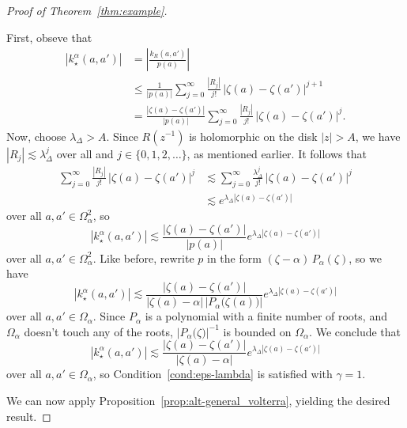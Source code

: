 \documentclass{article}
\theoremstyle{plain}
\newcommand{\softker}{k_\star}
\newcommand{\domain}{\Omega}
\begin{document}
\begin{proof}[Proof of Theorem~\ref{thm:example}]
\begin{itemize}
First, obseve that
\begin{align*}
|\softker^\alpha(a, a')| & = \left|\frac{k_R(a, a')}{p(a)}\right| \\
& \le \frac{1}{|p(a)|} \sum_{j=0}^\infty \frac{|R_{j}|}{j!} \, |\zeta(a)-\zeta(a')|^{j+1} \\
& = \frac{|\zeta(a)-\zeta(a')|}{|p(a)|} \sum_{j=0}^\infty \frac{|R_{j}|}{j!} \, |\zeta(a)-\zeta(a')|^j.
\end{align*}
Now, choose $\lambda_\Delta > A$. Since $R(z^{-1})$ is holomorphic on the disk $|z| > A$, we have $|R_j| \lesssim \lambda_\Delta^j$ over all and $j \in \{0, 1, 2, \ldots\}$, as mentioned earlier. It follows that
\begin{align*}
\sum_{j=0}^\infty \frac{|R_{j}|}{j!} \, |\zeta(a)-\zeta(a')|^j
& \lesssim \sum_{j=0}^\infty \frac{\lambda_\Delta^j}{j!} \, |\zeta(a)-\zeta(a')|^j \\
& \lesssim e^{\lambda_\Delta|\zeta(a)-\zeta(a')|}
\end{align*}
over all $a, a' \in \domain_\alpha^2$, so
\[ |\softker^\alpha(a, a')| \lesssim \frac{|\zeta(a)-\zeta(a')|}{|p(a)|} e^{\lambda_\Delta|\zeta(a)-\zeta(a')|} \]
over all $a, a' \in \domain_\alpha^2$. Like before, rewrite $p$ in the form $(\zeta - \alpha)\,P_\alpha(\zeta)$, so we have
\[ |\softker^\alpha(a, a')| \lesssim \frac{|\zeta(a)-\zeta(a')|}{|\zeta(a) - \alpha|\,\big|P_\alpha\big(\zeta(a)\big)\big|} e^{\lambda_\Delta|\zeta(a)-\zeta(a')|} \]
over all $a, a' \in \domain_\alpha$. Since $P_\alpha$ is a polynomial with a finite number of roots, and $\domain_\alpha$ doesn't touch any of the roots, $\big|P_\alpha\big(\zeta\big)\big|^{-1}$ is bounded on $\domain_\alpha$. We conclude that
\[ |\softker^\alpha(a, a')| \lesssim \frac{|\zeta(a)-\zeta(a')|}{|\zeta(a) - \alpha|} e^{\lambda_\Delta|\zeta(a)-\zeta(a')|} \]
over all $a, a' \in \domain_\alpha$, so Condition~\eqref{cond:eps-lambda} is satisfied with $\gamma = 1$.
\end{itemize}
We can now apply Proposition~\ref{prop:alt-general_volterra}, yielding the desired result.
\end{proof}


\end{document}
